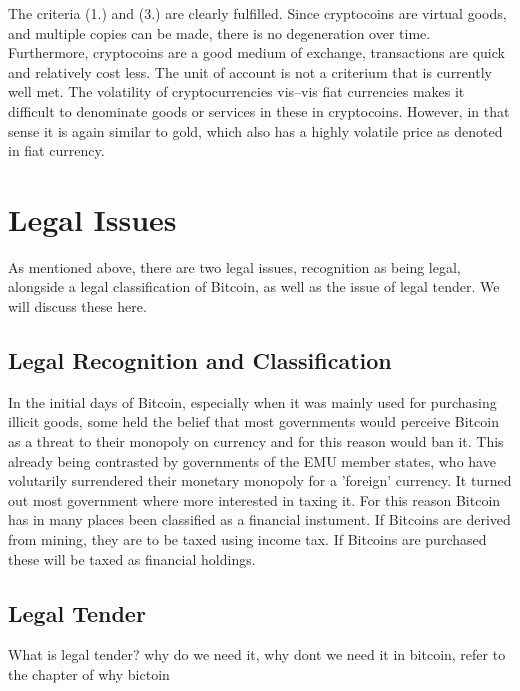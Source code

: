 The criteria (1.) and (3.) are clearly fulfilled. Since cryptocoins
are virtual goods, and multiple copies can be made, there is no degeneration
over time. Furthermore, cryptocoins are a good medium of exchange,
transactions are quick and relatively cost less. The unit of account
is not a criterium that is currently well met. The volatility of cryptocurrencies
vis--vis fiat currencies makes it difficult to denominate goods or
services in these in cryptocoins. However, in that sense it is again
similar to gold, which also has a highly volatile price as denoted
in fiat currency.


\section*{Legal Issues}

As mentioned above, there are two legal issues, recognition as being
legal, alongside a legal classification of Bitcoin, as well as the
issue of legal tender. We will discuss these here.


\subsection*{Legal Recognition and Classification}

In the initial days of Bitcoin, especially when it was mainly used
for purchasing illicit goods, some held the belief that most governments
would perceive Bitcoin as a threat to their monopoly on currency and
for this reason would ban it. This already being contrasted by governments
of the EMU member states, who have volutarily surrendered their monetary
monopoly for a 'foreign' currency. It turned out most government where
more interested in taxing it. For this reason Bitcoin has in many
places been classified as a financial instument. If Bitcoins are derived
from mining, they are to be taxed using income tax. If Bitcoins are
purchased these will be taxed as financial holdings.


\subsection*{Legal Tender}

What is legal tender? why do we need it, why dont we need it in bitcoin,
refer to the chapter of why bictoin
